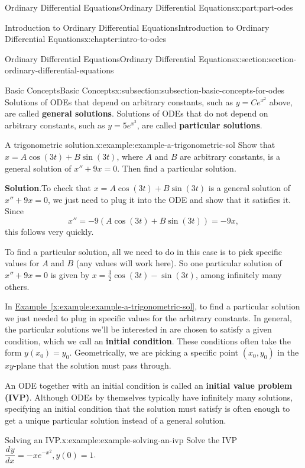 \documentclass[oneside,10pt,]{book}
\newcommand{\blocktitlefont}{\relax}
\newcommand{\xreffont}{\relax}
\newcommand{\terminology}[1]{\textbf{#1}}
\numberwithin{equation}{part}
\newcommand{\dv}[3][]{\dfrac{d^{#1} #2}{d #3^{#1}}}
\begin{document}
\begin{partptx}{Ordinary Differential Equations}{}{Ordinary Differential Equations}{}{}{x:part:part-odes}
\begin{chapterptx}{Introduction to Ordinary Differential Equations}{}{Introduction to Ordinary Differential Equations}{}{}{x:chapter:intro-to-odes}
\begin{sectionptx}{Ordinary Differential Equations}{}{Ordinary Differential Equations}{}{}{x:section:section-ordinary-differential-equations}
\begin{subsectionptx}{Basic Concepts}{}{Basic Concepts}{}{}{x:subsection:subsection-basic-concepts-for-odes}
Solutions of ODEs that depend on arbitrary constants, such as \(y = Ce^{x^{2}}\) above, are called \terminology{general solutions}. Solutions of ODEs that do not depend on arbitrary constants, such as \(y = 5e^{x^{2}}\), are called \terminology{particular solutions}.%
\begin{example}{A trigonometric solution.}{x:example:example-a-trigonometric-sol}%
Show that \(x = A\cos(3t) + B\sin(3t)\), where \(A\) and \(B\) are arbitrary constants, is a general solution of \(x'' + 9x = 0\). Then find a particular solution.%
\par\smallskip%
\noindent\textbf{\blocktitlefont Solution}.\hypertarget{g:solution:idp105548778892832}{}\quad{}To check that \(x = A\cos(3t) + B\sin(3t)\) is a general solution of \(x''+9x = 0\), we just need to plug it into the ODE and show that it satisfies it. Since%
\begin{equation*}
x'' = -9(A\cos(3t)+B\sin(3t)) = -9x,
\end{equation*}
this follows very quickly.%
\par
To find a particular solution, all we need to do in this case is to pick specific values for \(A\) and \(B\) (any values will work here). So one particular solution of \(x''+9x = 0\) is given by \(x = \frac{3}{2}\cos(3t) - \sin(3t)\), among infinitely many others.%
\end{example}
In \hyperref[x:example:example-a-trigonometric-sol]{Example~{\xreffont\ref{x:example:example-a-trigonometric-sol}}}, to find a particular solution we just needed to plug in specific values for the arbitrary constants. In general, the particular solutions we'll be interested in are chosen to satisfy a given condition, which we call an \terminology{initial condition}. These conditions often take the form \(y(x_{0}) = y_{0}\). Geometrically, we are picking a specific point \((x_{0},y_{0})\) in the \(xy\)-plane that the solution must pass through.%
\par
An ODE together with an initial condition is called an \terminology{initial value problem (IVP)}. Although ODEs by themselves typically have infinitely many solutions, specifying an initial condition that the solution must satisfy is often enough to get a unique particular solution instead of a general solution.%
\begin{example}{Solving an IVP.}{x:example:example-solving-an-ivp}%
Solve the IVP \(\dv{y}{x} = -xe^{-x^{2}}, y(0)=1\).%
\par\smallskip%

\end{example}
\end{subsectionptx}
\end{sectionptx}
\end{chapterptx}
\end{partptx}
\end{document}
